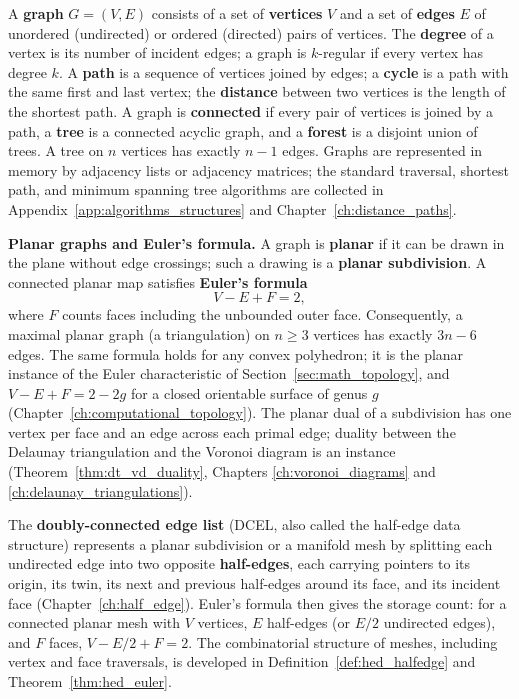 A \textbf{graph} $G = (V, E)$ consists of a set of \textbf{vertices} $V$ and
a set of \textbf{edges} $E$ of unordered (undirected) or ordered (directed)
pairs of vertices. The \textbf{degree} of a vertex is its number of incident
edges; a graph is $k$-regular if every vertex has degree $k$. A
\textbf{path} is a sequence of vertices joined by edges; a \textbf{cycle} is
a path with the same first and last vertex; the \textbf{distance} between two
vertices is the length of the shortest path. A graph is \textbf{connected} if
every pair of vertices is joined by a path, a \textbf{tree} is a connected
acyclic graph, and a \textbf{forest} is a disjoint union of trees. A tree on
$n$ vertices has exactly $n-1$ edges. Graphs are represented in memory by
adjacency lists or adjacency matrices; the standard traversal, shortest path,
and minimum spanning tree algorithms are collected in
Appendix~\ref{app:algorithms_structures} and
Chapter~\ref{ch:distance_paths}.

\medskip
\noindent\textbf{Planar graphs and Euler's formula.}
A graph is \textbf{planar} if it can be drawn in the plane without edge
crossings; such a drawing is a \textbf{planar subdivision}. A connected
planar map satisfies \textbf{Euler's formula}
\[
  V - E + F = 2,
\]
where $F$ counts faces including the unbounded outer face. Consequently, a
maximal planar graph (a triangulation) on $n \ge 3$ vertices has exactly
$3n - 6$ edges. The same formula holds for any convex polyhedron; it is the
planar instance of the Euler characteristic of
Section~\ref{sec:math_topology}, and $V - E + F = 2 - 2g$ for a closed
orientable surface of genus $g$
(Chapter~\ref{ch:computational_topology}). The planar dual of a subdivision
has one vertex per face and an edge across each primal edge; duality between
the Delaunay triangulation and the Voronoi diagram is an instance
(Theorem~\ref{thm:dt_vd_duality}, Chapters \ref{ch:voronoi_diagrams} and
\ref{ch:delaunay_triangulations}).

The \textbf{doubly-connected edge list} (DCEL, also called the half-edge data
structure) represents a planar subdivision or a manifold mesh by splitting
each undirected edge into two opposite \textbf{half-edges}, each carrying
pointers to its origin, its twin, its next and previous half-edges around its
face, and its incident face (Chapter~\ref{ch:half_edge}). Euler's formula
then gives the storage count: for a connected planar mesh with $V$ vertices,
$E$ half-edges (or $E/2$ undirected edges), and $F$ faces,
$V - E/2 + F = 2$. The combinatorial structure of meshes, including vertex
and face traversals, is developed in Definition~\ref{def:hed_halfedge} and
Theorem~\ref{thm:hed_euler}.

